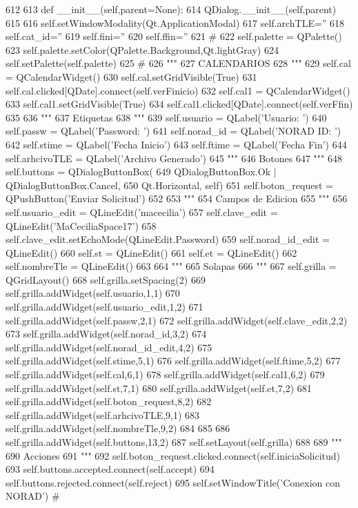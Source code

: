 \begin{DoxyCode}
612 
613     def __init__(self,parent=None):
614         QDialog.__init__(self,parent)
615 
616         self.setWindowModality(Qt.ApplicationModal)
617         self.archTLE=''
618         self.cat_id=''
619         self.fini=''
620         self.ffin=''
621 #         
622         self.palette = QPalette()
623         self.palette.setColor(QPalette.Background,Qt.lightGray)
624         self.setPalette(self.palette)
625 #         
626         """
627         CALENDARIOS
628         """
629         self.cal = QCalendarWidget()
630         self.cal.setGridVisible(True)
631         self.cal.clicked[QDate].connect(self.verFinicio)
632         self.cal1 = QCalendarWidget()
633         self.cal1.setGridVisible(True)
634         self.cal1.clicked[QDate].connect(self.verFfin)
635          
636         """
637         Etiquetas
638         """
639         self.usuario    = QLabel('Usuario: ')
640         self.passw      = QLabel('Password: ')
641         self.norad_id   = QLabel('NORAD ID: ')
642         self.stime      = QLabel('Fecha Inicio')
643         self.ftime      = QLabel('Fecha Fin')
644         self.arhcivoTLE = QLabel('Archivo Generado')
645         """
646         Botones
647         """
648         self.buttons = QDialogButtonBox(
649             QDialogButtonBox.Ok | QDialogButtonBox.Cancel,
650             Qt.Horizontal, self)
651         self.boton_request = QPushButton('Enviar Solicitud')
652 
653         """
654         Campos de Edicion
655         """
656         self.usuario_edit  = QLineEdit('macecilia')
657         self.clave_edit    = QLineEdit('MaCeciliaSpace17')
658         self.clave_edit.setEchoMode(QLineEdit.Password)
659         self.norad_id_edit = QLineEdit()
660         self.st            = QLineEdit()
661         self.et            = QLineEdit()
662         self.nombreTle     = QLineEdit()
663 
664         """
665         Solapas
666         """        
667         self.grilla = QGridLayout()
668         self.grilla.setSpacing(2)
669         self.grilla.addWidget(self.usuario,1,1)
670         self.grilla.addWidget(self.usuario_edit,1,2)
671         self.grilla.addWidget(self.passw,2,1)
672         self.grilla.addWidget(self.clave_edit,2,2)
673         self.grilla.addWidget(self.norad_id,3,2)
674         self.grilla.addWidget(self.norad_id_edit,4,2)
675         self.grilla.addWidget(self.stime,5,1)
676         self.grilla.addWidget(self.ftime,5,2)
677         self.grilla.addWidget(self.cal,6,1)
678         self.grilla.addWidget(self.cal1,6,2)
679         self.grilla.addWidget(self.st,7,1)
680         self.grilla.addWidget(self.et,7,2)
681         self.grilla.addWidget(self.boton_request,8,2)
682         self.grilla.addWidget(self.arhcivoTLE,9,1)
683         self.grilla.addWidget(self.nombreTle,9,2)
684         
685 
686         self.grilla.addWidget(self.buttons,13,2) 
687         self.setLayout(self.grilla) 
688         
689         """
690         Acciones
691         """
692         self.boton_request.clicked.connect(self.iniciaSolicitud)
693         self.buttons.accepted.connect(self.accept)
694         self.buttons.rejected.connect(self.reject)  
695         self.setWindowTitle('Conexion con NORAD')
#         
\end{DoxyCode}
